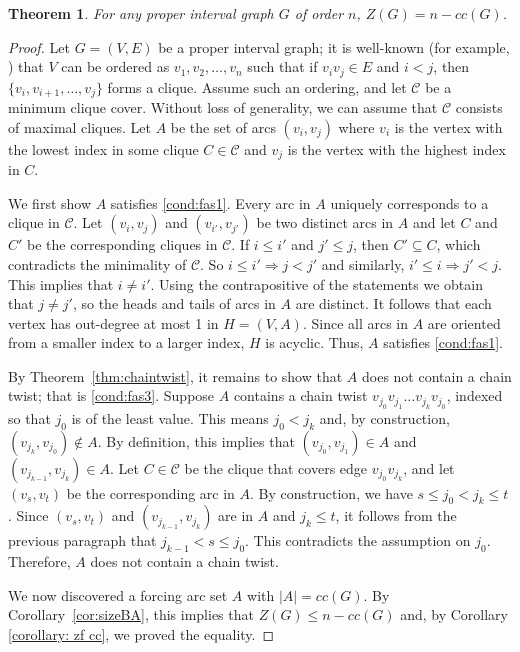 \documentclass[12pt]{amsart}
\theoremstyle{plain}
\newtheorem{theorem}{Theorem}[section]
\theoremstyle{definition}
\def\C{\mathcal C}
\renewcommand{\subset}{\subseteq}
\begin{document}
\begin{theorem}
    For any proper interval graph $G$ of order $n$, $Z(G)=n-cc(G)$.
\end{theorem}
\begin{proof}
Let $G = (V, E)$ be a proper interval graph; it is well-known (for example, \cite{roberts1971compatibility}) that $V$ can be ordered as $v_1,v_2,\dots, v_n$ such that if $v_iv_j\in E$ and $i<j$, then $\{v_i, v_{i+1}, \dots, v_j\}$ forms a clique. Assume such an ordering, and let $\C$ be a minimum clique cover. Without loss of generality, we can assume that $\C$ consists of maximal cliques. 
Let $A$ be the set of arcs $(v_i,v_j)$ where $v_i$ is the vertex with the lowest index in some clique $C\in\C$ and $v_j$ is the vertex with the highest index in $C$. 
    
We first show $A$ satisfies \ref{cond:fas1}. 
Every arc in $A$ uniquely corresponds to a clique in $\C$. Let $(v_i,v_j)$ and $(v_{i'},v_{j'})$ be two distinct arcs in $A$ and let $C$ and $C'$ be the corresponding cliques in $\C$. If $i\leq i'$ and $j'\leq j$, then $C'\subset C$, which contradicts the minimality of $\C$. So $i\leq i'\Rightarrow j<  j'$ and similarly, $i'\leq i\Rightarrow j'< j$.  This implies that $i\neq i'$. Using the contrapositive of the statements we obtain that $j\not= j'$, so the heads and tails of arcs in $A$ are distinct. It follows that each vertex has out-degree at most 1 in $H=(V, A)$.   
Since all arcs in $A$ are oriented from a smaller index to a larger index, $H$ is acyclic. Thus, $A$ satisfies \ref{cond:fas1}.  

By Theorem~\ref{thm:chaintwist}, it remains to show that $A$ does not contain a chain twist; that is \ref{cond:fas3}. 
Suppose $A$ contains a chain twist $v_{j_0}v_{j_1}\dots v_{j_k}v_{j_0}$, indexed so that $j_0$ is of the least value. 
This means $j_0<j_k$ and, by construction, $(v_{j_k},v_{j_0})\not\in A$. By definition, this implies that $(v_{j_0},v_{j_1})\in A$ and $(v_{j_{k-1}},v_{j_k})\in A$.
Let $C\in \C$ be the clique that covers edge $v_{j_0}v_{j_k}$, and let $(v_s,v_t)$ be the corresponding arc in $A$. 
By construction, we have $s\leq j_0< j_k\leq t$. Since $(v_s,v_t)$ and $(v_{j_{k-1}},v_{j_k})$ are in $A$ and $j_k\leq t$, it follows from the previous paragraph that $j_{k-1}<s\leq j_0$. This contradicts the assumption on $j_0$. 
Therefore, $A$ does not contain a chain twist.
    
We now discovered a forcing arc set $A$ with $|A| = cc(G)$. 
By Corollary~\ref{cor:sizeBA}, this implies that $Z(G)\leq n-cc(G)$ and, by Corollary \ref{corollary: zf cc}, we proved the equality. 
\end{proof}
\end{document}
